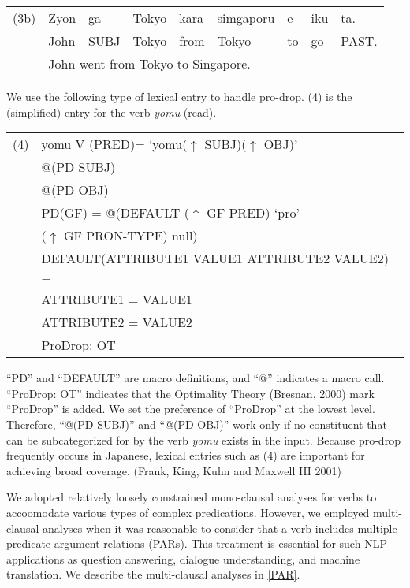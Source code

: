 \documentclass[english]{jnlp_1.4_rep}
\begin{document}
\noindent
\begin{tabular}{ll@{ }l@{ }l@{ }l@{ }l@{ }l@{ }l@{ }l}
(3b) & Zyon&ga&Tokyo&kara&simgaporu&e&iku&ta.\\
     & John&SUBJ&Tokyo&from&Tokyo&to&go&PAST.\\
     & \multicolumn{8}{l}{\quad John went from Tokyo to Singapore.}
\end{tabular}
\vspace{4pt}

We use the following type of lexical entry to handle pro-drop.  (4) is
the (simplified) entry for the verb \textit{yomu} (read).

\vspace{2pt}
\noindent
\begin{tabular}{ll}
(4) & yomu \quad V \quad (PRED)= `yomu($\uparrow$ SUBJ)($\uparrow$ OBJ)'\\
    & \quad \qquad \qquad @(PD SUBJ)\\
    & \quad \qquad \qquad @(PD OBJ)\\
    & PD(GF) = @(DEFAULT ($\uparrow$ GF PRED) `pro' \\
    & \qquad \qquad \qquad \qquad($\uparrow$ GF PRON-TYPE) null)\\
    & DEFAULT(ATTRIBUTE1 VALUE1 ATTRIBUTE2 VALUE2) = \\
    & \quad\qquad \qquad ATTRIBUTE1 = VALUE1\\
    & \quad\qquad \qquad ATTRIBUTE2 = VALUE2\\
    & \quad\qquad \qquad ProDrop: OT
\end{tabular}
\vspace{4pt}

``PD'' and ``DEFAULT'' are macro definitions, and ``@'' indicates a macro
call.  ``ProDrop: OT'' indicates that the Optimality Theory (Bresnan,
2000) mark ``ProDrop'' is added.  We set the preference of ``ProDrop'' at
the lowest level.  Therefore, ``@(PD SUBJ)'' and ``@(PD OBJ)'' work only if
no constituent that can be subcategorized for by the verb \textit{yomu} exists
in the input.  Because pro-drop frequently occurs in Japanese, lexical
entries such as (4) are important for achieving broad coverage.  (Frank, King, Kuhn and Maxwell III 
2001)

We adopted relatively loosely constrained mono-clausal analyses for
verbs to accoomodate various types of complex predications.  However,
we employed multi-clausal analyses when it was reasonable to consider
that a verb includes multiple predicate-argument relations (PARs).
This treatment is essential for such NLP applications as question
answering, dialogue understanding, and machine translation.  We
describe the multi-clausal analyses in \ref{PAR}.
\end{document}
